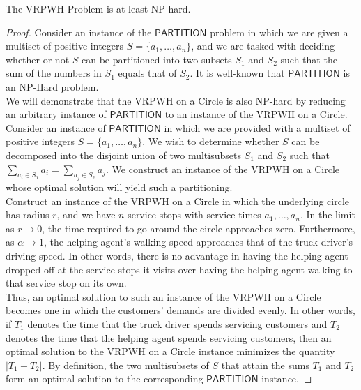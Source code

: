 \documentclass[12pt]{scrartcl}
\begin{document}
\begin{proposition}
The VRPWH Problem is at least NP-hard. 
\end{proposition}
\begin{proof}
Consider an instance of the $\mathsf{PARTITION}$ problem in which we are given a multiset of positive integers $S = \{a_1, \ldots, a_n\}$, and we are tasked with deciding whether or not $S$ can be partitioned into two subsets $S_1$ and $S_2$ such that the sum of the numbers in $S_1$ equals that of $S_2$. It is well-known that $\mathsf{PARTITION}$ is an NP-Hard problem. \\ 

We will demonstrate that the VRPWH on a Circle is also NP-hard by reducing an arbitrary instance of $\mathsf{PARTITION}$ to an instance of the VRPWH on a Circle. \\

Consider an instance of $\mathsf{PARTITION}$ in which we are provided with a multiset of positive integers $S = \{a_1, \ldots, a_n\}$. We wish to determine whether $S$ can be decomposed into the disjoint union of two multisubsets $S_1$ and $S_2$ such that $\sum_{a_i \in S_1} a_i = \sum_{a_j \in S_2} a_j$. We construct an instance of the VRPWH on a Circle whose optimal solution will yield such a partitioning. \\

Construct an instance of the VRPWH on a Circle in which the underlying circle has radius $r$, and we have $n$ service stops with service times $a_1, \ldots, a_n$. In the limit as $r \to 0$, the time required to go around the circle approaches zero. Furthermore, as $\alpha \to 1$, the helping agent's walking speed approaches that of the truck driver's driving speed. In other words, there is no advantage in having the helping agent dropped off at the service stops it visits over having the helping agent walking to that service stop on its own. \\

Thus, an optimal solution to such an instance of the VRPWH on a Circle becomes one in which the customers' demands are divided evenly. In other words, if $T_1$ denotes the time that the truck driver spends servicing customers and $T_2$ denotes the time that the helping agent spends servicing customers, then an optimal solution to the VRPWH on a Circle instance minimizes the quantity $|T_1 - T_2|$. By definition, the two multisubsets of $S$ that attain the sums $T_1$ and $T_2$ form an optimal solution to the corresponding $\mathsf{PARTITION}$ instance. 
\end{proof}
\end{document}
